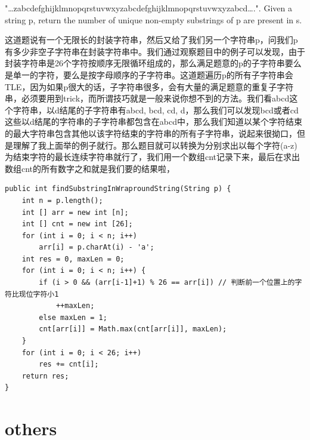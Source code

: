 \documentclass[9pt, b5paper]{article}
\begin{document}
"\ldots{}zabcdefghijklmnopqrstuvwxyzabcdefghijklmnopqrstuvwxyzabcd\ldots{}.".
Given a string p, return the number of unique non-empty substrings of p are present in s.

这道题说有一个无限长的封装字符串，然后又给了我们另一个字符串p，问我们p有多少非空子字符串在封装字符串中。我们通过观察题目中的例子可以发现，由于封装字符串是26个字符按顺序无限循环组成的，那么满足题意的p的子字符串要么是单一的字符，要么是按字母顺序的子字符串。这道题遍历p的所有子字符串会TLE，因为如果p很大的话，子字符串很多，会有大量的满足题意的重复子字符串，必须要用到trick，而所谓技巧就是一般来说你想不到的方法。我们看abcd这个字符串，以d结尾的子字符串有abcd, bcd, cd, d，那么我们可以发现bcd或者cd这些以d结尾的字符串的子字符串都包含在abcd中，那么我们知道以某个字符结束的最大字符串包含其他以该字符结束的字符串的所有子字符串，说起来很拗口，但是理解了我上面举的例子就行。那么题目就可以转换为分别求出以每个字符(a-z)为结束字符的最长连续字符串就行了，我们用一个数组cnt记录下来，最后在求出数组cnt的所有数字之和就是我们要的结果啦，

\begin{verbatim}
public int findSubstringInWraproundString(String p) {
    int n = p.length();
    int [] arr = new int [n];
    int [] cnt = new int [26];
    for (int i = 0; i < n; i++) 
        arr[i] = p.charAt(i) - 'a';
    int res = 0, maxLen = 0;
    for (int i = 0; i < n; i++) {
        if (i > 0 && (arr[i-1]+1) % 26 == arr[i]) // 判断前一个位置上的字符比现位字符小1
            ++maxLen;
        else maxLen = 1;
        cnt[arr[i]] = Math.max(cnt[arr[i]], maxLen);
    }
    for (int i = 0; i < 26; i++) 
        res += cnt[i];
    return res;
}
\end{verbatim}


\section{others}
\label{sec-17}
\end{document}
